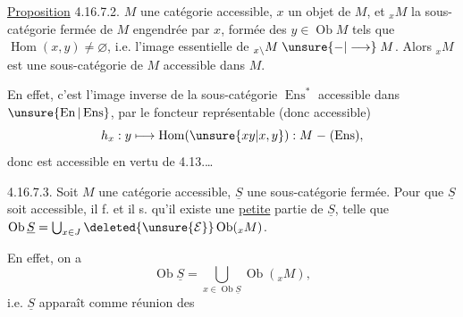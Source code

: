 \uline{Proposition} 4.16.7.2.  $M$ une catégorie
accessible, $x$ un objet de $M$, et $ {}_xM$ la
sous-catégorie fermée de $M$ engendrée
par $x$, formée des $y\in\operatorname{Ob}M$ tels que
$\operatorname{Hom}(x,y)\ne\varnothing$, i.e.  l'image essentielle
de $ {}_{x\backslash}M\mathrel{\unsure{-|\longrightarrow}}M$. Alors $ {}_xM$ est une
sous-catégorie de $M$ accessible dans $M$.

En effet, c'est l'image inverse de la
sous-catégorie $\operatorname{Ens}^{*}$ accessible dans $\unsure{\operatorname{En}|\operatorname{Ens}}$,
par le foncteur représentable (donc
accessible)
\[
h_x:y\longmapsto\operatorname{Hom}(\unsure{xy|x,y}):M\mathrel{-}(\operatorname{Ens}),
\]
donc est accessible  en vertu de 4.13.\ldots

\uline{} 4.16.7.3. Soit $M$ une catégorie
accessible, $\underline S$ une sous-catégorie fermée.
Pour que $\underline S$ soit accessible, il f. et il
s. qu'il existe une \uline{petite} partie
 de $\underline S$, telle que $\operatorname{Ob}\underline S=\bigcup_{x\in J}\deleted{\unsure{\mathcal E}}\operatorname{Ob}({}_xM)$.

En effet, on a
\[
\operatorname{Ob}\underline S=\bigcup_{x\in\operatorname{Ob}\underline S}\operatorname{Ob}({}_xM),
\]
i.e. $\underline S$ apparaît comme réunion des
